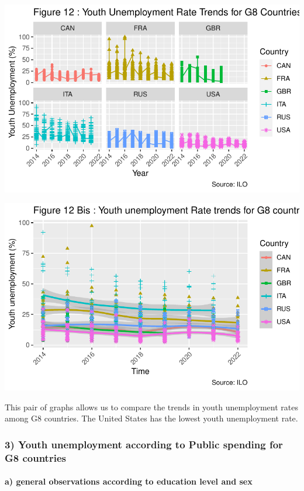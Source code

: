 \documentclass[
  letterpaper,
  DIV=11,
  numbers=noendperiod]{scrartcl}
\let\oldparagraph\paragraph
\renewcommand{\paragraph}[1]{\oldparagraph{#1}\mbox{}}
\begin{document}
\includegraphics{Projet-BM_files/figure-pdf/unnamed-chunk-23-1.pdf}

\includegraphics{Projet-BM_files/figure-pdf/unnamed-chunk-24-1.pdf}

This pair of graphs allows us to compare the trends in youth
unemployment rates among G8 countries. The United States has the lowest
youth unemployment rate.

\hypertarget{youth-unemployment-according-to-public-spending-for-g8-countries}{%
\subsubsection{3) Youth unemployment according to Public spending for G8
countries}\label{youth-unemployment-according-to-public-spending-for-g8-countries}}

\hypertarget{a-general-observations-according-to-education-level-and-sex}{%
\paragraph{a) general observations according to education level and
sex}\label{a-general-observations-according-to-education-level-and-sex}}
\end{document}
